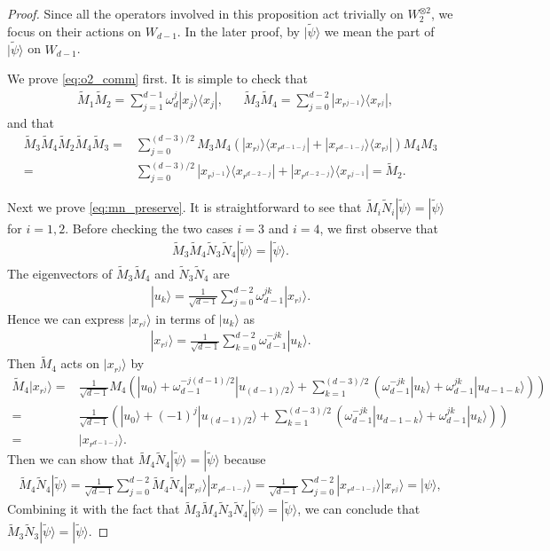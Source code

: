 \documentclass[11pt,letterpaper]{article}
\newcommand{\ket}[1]{|#1\rangle}
\newcommand{\ketbra}[2]{|#1\rangle\langle#2|}
\newcommand{\x}{\otimes}
\newcommand{\1}{\mathbb{1}}
\newcommand{\tM}{\tilde{M}}
\newcommand{\tN}{\tilde{N}}
\newcommand{\tpsi}{\tilde{\psi}}
\theoremstyle{definition}
\begin{document}
\begin{proof}
	Since all the operators involved in this proposition act trivially on $W_2^{\x 2}$, we focus on
	their actions on $W_{d-1}$. In the later proof, by $\ket{\tpsi}$ we mean the part of $\ket{\tpsi}$ on $W_{d-1}$.
	
	We prove \cref{eq:o2_comm} first. It is simple to check that
	\begin{align*}
		&\tM_1\tM_2= \sum_{j=1}^{d-1} \omega_d^{j} \ketbra{x_j}{x_j},
		&&\tM_3\tM_4= \sum_{j=0}^{d-2} \ketbra{x_{r^{j-1}}}{x_{r^j}},
	\end{align*}
	and that 
	\begin{align*}
		\tM_3\tM_4 \tM_2 \tM_4 \tM_3 = &\sum_{j=0}^{(d-3)/2} M_3M_4 (\ketbra{x_{r^j}}{x_{r^{d-1-j}}}+\ketbra{x_{r^{d-1-j}}}{x_{r^j}}) M_4M_3\\
		=& \sum_{j=0}^{(d-3)/2} \ketbra{x_{r^{j-1}}}{x_{r^{d-2-j}}}+\ketbra{x_{r^{d-2-j}}}{x_{r^{j-1}}} = \tM_2.
	\end{align*}
	
	Next we prove \cref{eq:mn_preserve}. It is straightforward to see that $\tM_i\tN_i \ket{\tpsi} = \ket{\tpsi}$ for $i = 1,2$.
	Before checking the two cases $i=3$ and $i=4$, we first observe that
	\begin{align*}
		\tM_3\tM_4 \tN_3 \tN_4 \ket{\tpsi} = \ket{\tpsi}.
	\end{align*}
	The eigenvectors of $\tM_3\tM_4$ and $\tN_3\tN_4$ are 
        \begin{align*}
        		\ket{u_k} = \frac{1}{\sqrt{d-1}} \sum_{j=0}^{d-2} \omega_{d-1}^{jk} \ket{x_{r^j}}.
        \end{align*}
        Hence we can express $\ket{x_{r^j}}$ in terms of $\ket{u_k}$ as 
        \begin{align*}
        		\ket{x_{r^j}} = \frac{1}{\sqrt{d-1}} \sum_{k=0}^{d-2} \omega_{d-1}^{-jk} \ket{u_k}.
        \end{align*}
        Then $\tM_4$ acts on $\ket{x_{r^j}}$ by
        \begin{align*}
        		\tM_4 \ket{x_{r^j}} =& \frac{1}{\sqrt{d-1}} M_4\left(\ket{u_0} + \omega_{d-1}^{-j(d-1)/2}\ket{u_{(d-1)/2}}  + 
        	\sum_{k=1}^{(d-3)/2} (\omega_{d-1}^{-jk} \ket{u_k} + \omega_{d-1}^{jk} \ket{u_{d-1-k}})\right) \\
        	=&\frac{1}{\sqrt{d-1}} \left(\ket{u_0} + (-1)^j\ket{u_{(d-1)/2}}  + 
        	\sum_{k=1}^{(d-3)/2} (\omega_{d-1}^{-jk} \ket{u_{d-1-k}} + \omega_{d-1}^{jk} \ket{u_{k}})\right) \\
        	=& \ket{x_{r^{d-1-j}}}.
        \end{align*}
        Then we can show that $\tM_4  \tN_4 \ket{\tpsi} = \ket{\tpsi}$ because 
        \begin{align*}
        	\tM_4 \tN_4 \ket{\tpsi} = \frac{1}{\sqrt{d-1}}  \sum_{j=0}^{d-2} \tM_4  \tN_4 \ket{x_{r^j}} \ket{x_{r^{d-1-j}}} 
        	= \frac{1}{\sqrt{d-1}} \sum_{j=0}^{d-2} \ket{x_{r^{d-1-j}}} \ket{x_{r^{j}}} =\ket{\psi},
        \end{align*}
	Combining it with the fact that $\tM_3\tM_4 \tN_3\tN_4 \ket{\tpsi} = \ket{\tpsi}$, we can conclude that
	$\tM_3\tN_3 \ket{\tpsi} = \ket{\tpsi}$.
\end{proof}
\end{document}
